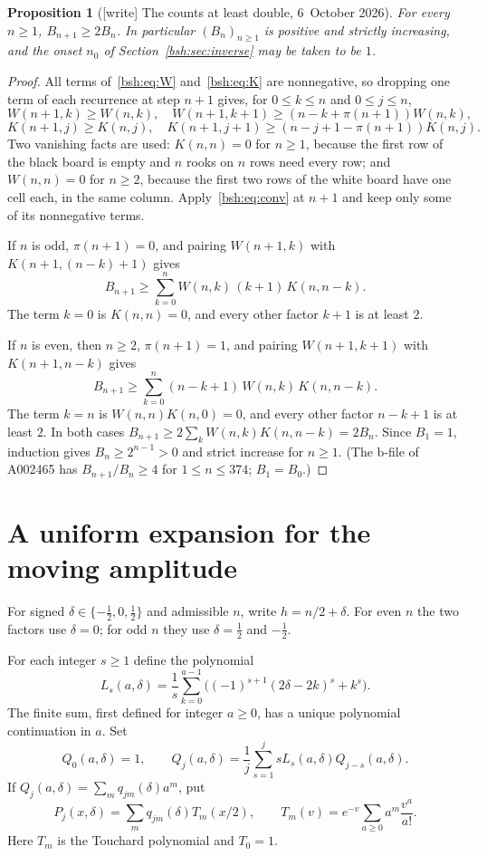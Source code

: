 \documentclass[11pt,letterpaper]{article}
\newtheorem{proposition}[theorem]{Proposition}
\theoremstyle{remark}\newtheorem{remark}[theorem]{Remark}
\begin{document}
\begin{proposition}[{[write]} The counts at least double, 6~October 2026]\label{bsh:prop:doubling}
For every $n\ge1$, $B_{n+1}\ge2B_n$. In particular $(B_n)_{n\ge1}$ is
positive and strictly increasing, and the onset $n_0$ of
Section~\ref{bsh:sec:inverse} may be taken to be $1$.
\end{proposition}
\begin{proof}
All terms of~\eqref{bsh:eq:W} and~\eqref{bsh:eq:K} are nonnegative, so
dropping one term of each recurrence at step $n+1$ gives, for $0\le k\le n$
and $0\le j\le n$,
\[
 W(n+1,k)\ge W(n,k),\quad
 W(n+1,k+1)\ge(n-k+\pi(n+1))W(n,k),
\]
\[
 K(n+1,j)\ge K(n,j),\quad
 K(n+1,j+1)\ge(n-j+1-\pi(n+1))K(n,j).
\]
Two vanishing facts are used: $K(n,n)=0$ for $n\ge1$, because the first row
of the black board is empty and $n$ rooks on $n$ rows need every row; and
$W(n,n)=0$ for $n\ge2$, because the first two rows of the white board have
one cell each, in the same column. Apply~\eqref{bsh:eq:conv} at $n+1$ and
keep only some of its nonnegative terms.

If $n$ is odd, $\pi(n+1)=0$, and pairing $W(n+1,k)$ with
$K(n+1,(n-k)+1)$ gives
\[
 B_{n+1}\ge\sum_{k=0}^{n}W(n,k)\,(k+1)\,K(n,n-k).
\]
The term $k=0$ is $K(n,n)=0$, and every other factor $k+1$ is at least $2$.

If $n$ is even, then $n\ge2$, $\pi(n+1)=1$, and pairing $W(n+1,k+1)$ with
$K(n+1,n-k)$ gives
\[
 B_{n+1}\ge\sum_{k=0}^{n}(n-k+1)\,W(n,k)\,K(n,n-k).
\]
The term $k=n$ is $W(n,n)K(n,0)=0$, and every other factor $n-k+1$ is at
least $2$. In both cases $B_{n+1}\ge2\sum_{k}W(n,k)K(n,n-k)=2B_n$. Since
$B_1=1$, induction gives $B_n\ge2^{n-1}>0$ and strict increase for $n\ge1$.
(The b-file of A002465 has $B_{n+1}/B_n\ge4$ for $1\le n\le374$; $B_1=B_0$.)
\end{proof}

\section{A uniform expansion for the moving amplitude}\label{bsh:sec:amplitude}
For signed $\delta\in\{-\tfrac12,0,\tfrac12\}$ and admissible $n$, write $h=n/2+\delta$. For even $n$ the two factors use $\delta=0$; for odd $n$ they use $\delta=\tfrac12$ and $-\tfrac12$.

For each integer $s\geq1$ define the polynomial
\begin{equation}\label{bsh:eq:Ls}
 L_s(a,\delta)=\frac1s\sum_{k=0}^{a-1}
       \bigl((-1)^{s+1}(2\delta-2k)^s+k^s\bigr).
\end{equation}
The finite sum, first defined for integer $a\geq0$, has a unique polynomial continuation in $a$. Set
\begin{equation}\label{bsh:eq:Qs}
 Q_0(a,\delta)=1,\qquad
 Q_j(a,\delta)=\frac1j\sum_{s=1}^j sL_s(a,\delta)Q_{j-s}(a,\delta).
\end{equation}
If $Q_j(a,\delta)=\sum_m q_{jm}(\delta)a^m$, put
\begin{equation}\label{bsh:eq:Ps}
 P_j(x,\delta)=\sum_m q_{jm}(\delta)T_m(x/2),\qquad
 T_m(v)=e^{-v}\sum_{a\geq0}a^m\frac{v^a}{a!}.
\end{equation}
Here $T_m$ is the Touchard polynomial and $T_0=1$.
\end{document}
